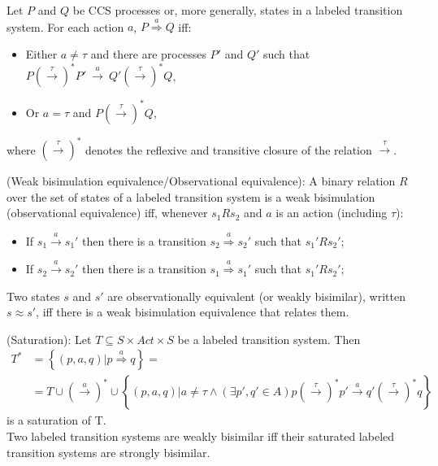 \begin{definition}
Let $P$ and $Q$ be CCS processes or, more generally, states in a labeled transition system. For each action $a$,
$P\stackrel{a}{\Rightarrow}Q$ iff:
\begin{itemize}
	\item Either $a\neq\tau$ and there are processes $P'$ and $Q'$ such that $P\left(\stackrel{\tau}{\rightarrow}\right)^{*}P'\ \stackrel{a}{\rightarrow}\ Q'\left(\stackrel{\tau}{\rightarrow}\right)^{*}Q$,
	\item Or $a=\tau$ and $P\left(\stackrel{\tau}{\rightarrow}\right)^{*}Q$,
\end{itemize}
where $\left(\stackrel{\tau}{\rightarrow}\right)^{*}$ denotes the reflexive and transitive closure of the relation $\stackrel{\tau}{\rightarrow}$.
\end{definition}

\begin{definition}
(Weak bisimulation equivalence/Observational equivalence): A binary relation $R$ over the set of states of a labeled transition system is a weak bisimulation (observational equivalence) iff, whenever $s_{1}Rs_{2}$ and $a$ is an action (including $\tau$):
\begin{itemize}
	\item If $s_{1}\stackrel{a}{\rightarrow}s_{1}'$ then there is a transition $s_{2}\stackrel{a}{\Rightarrow}s_{2}'$ such that $s_{1}'Rs_{2}'$;
	\item If $s_{2}\stackrel{a}{\rightarrow}s_{2}'$ then there is a transition $s_{1}\stackrel{a}{\Rightarrow}s_{1}'$ such that $s_{1}'Rs_{2}'$;
\end{itemize}
Two states $s$ and $s'$ are observationally equivalent (or weakly bisimilar), written $s\approx s'$, iff there is a weak bisimulation equivalence that relates them.
\end{definition}

\begin{definition}
(Saturation): Let $T\subseteq S\times Act\times S$ be a labeled transition system. Then
\begin{align*}
 T^{*} &=\left\{\left(p,a,q\right)| p\stackrel{a}{\Rightarrow}q\right\}= \\
 &=T\cup\left(\stackrel{a}{\rightarrow}\right)^{*}\cup\left\{\left(p,a,q\right)| a\neq\tau\wedge\left(\exists p',q'\in A\right) p\left(\stackrel{\tau}{\rightarrow}\right)^{*}p'\stackrel{a}{\rightarrow}q'\left(\stackrel{\tau}{\rightarrow}\right)^{*}q\right\}
\end{align*} 
is a saturation of T.\\
Two labeled transition systems are weakly bisimilar iff their saturated labeled transition systems are strongly bisimilar. 
\end{definition}

